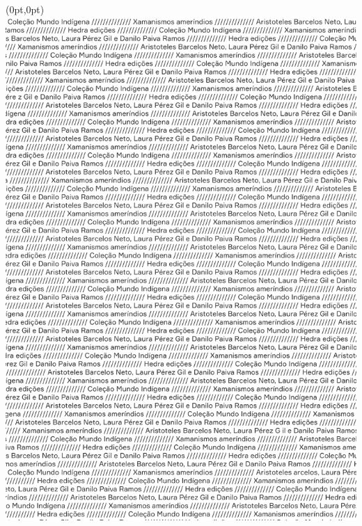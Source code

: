 \thispagestyle{empty}
\begin{textblock*}{2.625in}(0pt,0pt)%
\vspace*{-3.72cm}
\hspace*{-3cm}\includegraphics[width=170mm]{./ABERTURA.png}  
\end{textblock*}
\clearpage

\thispagestyle{empty}



